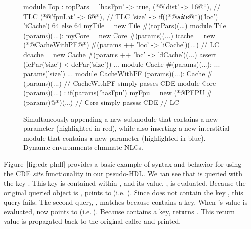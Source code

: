 \begin{figure}
\centering
\begin{phdl}
module Top :
  topPars = {'hasFpu' -> true,
             (*@\textcolor[rgb]{1,0,0}{'dist' -> 16}@*),                                   // TLC
             (*@\textcolor[rgb]{0,0,1}{'fpuLat' -> 6}@*),                                  // TLC
             'size' -> if((*@\textcolor[rgb]{1,0.5,0}{\textbf{\textit{site}}}@*)('loc') == 'iCache') 64 else 64 }
  myTile = new Tile #(topPars)(...)
module Tile (params)(...):
  myCore = new Core #(params)(...)
  icache = new (*@\textcolor[rgb]{1,0,0}{CacheWithPF}@*) #(params ++ {'loc' -> 'iCache'})(...) // LC
  dcache = new Cache #(params ++ {'loc' -> 'dCache'})(...)
  assert (icPar('size') < dcPar('size')) ...
module Cache #(params)(...):
  ... params('size') ...
module CacheWithPF (params)(...):
  Cache #(params)(...)        // CacheWithPF simply passes CDE
module Core (params)(...) :
  if(params('hasFpu') myFpu = new (*@\textcolor[rgb]{0,0,1}{PFPU \#(params)}@*)(...) // Core simply passes CDE  // LC
\end{phdl} 
\caption[Modifying the example with CDEs.]{Simultaneously appending a new submodule that contains a new parameter (highlighted in red), while also inserting
a new interstitial module that contains a new parameter (highlighted in blue). Dynamic environments eliminate NLCs.}
\label{fig:cde-delta}
\end{figure}

Figure~\ref{fig:cde-phdl} provides a basic example of syntax and behavior for using the CDE {\em site} functionality in our pseudo-HDL.
We can see that  is queried with the key . 
This key is contained within , and its value, , is evaluated. 
Because the original queried object is ,  points to  (i.e. ). 
Since  does not contain the key , this query fails.
The second query, , matches because  contains a  key. 
When 's value is evaluated,  now points to  (i.e. ). 
Because  contains a  key,  returns . 
This return value is propagated back to the original  callee and printed.

